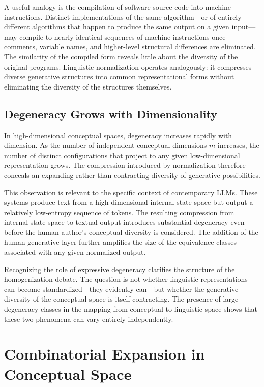 \documentclass[12pt,a4paper]{article}
\theoremstyle{definition}
\theoremstyle{plain}
\theoremstyle{remark}
\begin{document}
A useful analogy is the compilation of software source code into machine instructions. Distinct
implementations of the same algorithm---or of entirely different algorithms that happen to
produce the same output on a given input---may compile to nearly identical sequences of
machine instructions once comments, variable names, and higher-level structural differences
are eliminated. The similarity of the compiled form reveals little about the diversity of the
original programs. Linguistic normalization operates analogously: it compresses diverse
generative structures into common representational forms without eliminating the diversity of
the structures themselves.

\subsection{Degeneracy Grows with Dimensionality}

In high-dimensional conceptual spaces, degeneracy increases rapidly with dimension. As the
number of independent conceptual dimensions $m$ increases, the number of distinct
configurations that project to any given low-dimensional representation grows. The
compression introduced by normalization therefore conceals an expanding rather than
contracting diversity of generative possibilities.

This observation is relevant to the specific context of contemporary LLMs. These systems
produce text from a high-dimensional internal state space but output a relatively low-entropy
sequence of tokens. The resulting compression from internal state space to textual output
introduces substantial degeneracy even before the human author's conceptual diversity is
considered. The addition of the human generative layer further amplifies the size of the
equivalence classes associated with any given normalized output.

Recognizing the role of expressive degeneracy clarifies the structure of the homogenization
debate. The question is not whether linguistic representations can become standardized---they
evidently can---but whether the generative diversity of the conceptual space is itself
contracting. The presence of large degeneracy classes in the mapping from conceptual to
linguistic space shows that these two phenomena can vary entirely independently.

\section{Combinatorial Expansion in Conceptual Space}
\label{sec:combinatorial}
\end{document}
